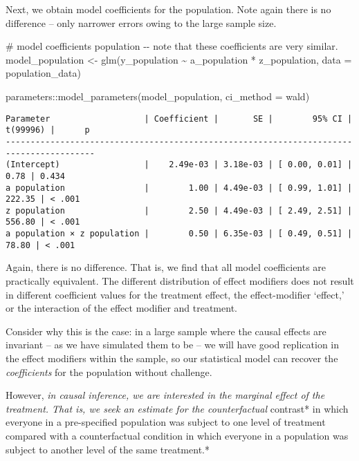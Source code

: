 \documentclass[
  single column]{article}
\newenvironment{Shaded}{\begin{snugshade}}{\end{snugshade}}
\newcommand{\AttributeTok}[1]{\textcolor[rgb]{0.40,0.45,0.13}{#1}}
\newcommand{\CommentTok}[1]{\textcolor[rgb]{0.37,0.37,0.37}{#1}}
\newcommand{\FunctionTok}[1]{\textcolor[rgb]{0.28,0.35,0.67}{#1}}
\newcommand{\NormalTok}[1]{\textcolor[rgb]{0.00,0.23,0.31}{#1}}
\newcommand{\OtherTok}[1]{\textcolor[rgb]{0.00,0.23,0.31}{#1}}
\newcommand{\SpecialCharTok}[1]{\textcolor[rgb]{0.37,0.37,0.37}{#1}}
\newcommand{\StringTok}[1]{\textcolor[rgb]{0.13,0.47,0.30}{#1}}
\begin{document}
Next, we obtain model coefficients for the population. Note again there
is no difference -- only narrower errors owing to the large sample size.

\begin{Shaded}
\begin{Highlighting}[]
\CommentTok{\# model coefficients population {-}{-} note that these coefficients are very similar. }
\NormalTok{model\_population }\OtherTok{\textless{}{-}} \FunctionTok{glm}\NormalTok{(y\_population }\SpecialCharTok{\textasciitilde{}}\NormalTok{ a\_population }\SpecialCharTok{*}\NormalTok{ z\_population, }
  \AttributeTok{data =}\NormalTok{ population\_data)}

\NormalTok{parameters}\SpecialCharTok{::}\FunctionTok{model\_parameters}\NormalTok{(model\_population, }\AttributeTok{ci\_method =} \StringTok{\textquotesingle{}wald\textquotesingle{}}\NormalTok{)}
\end{Highlighting}
\end{Shaded}

\begin{verbatim}
Parameter                   | Coefficient |       SE |        95% CI | t(99996) |      p
----------------------------------------------------------------------------------------
(Intercept)                 |    2.49e-03 | 3.18e-03 | [ 0.00, 0.01] |     0.78 | 0.434 
a population                |        1.00 | 4.49e-03 | [ 0.99, 1.01] |   222.35 | < .001
z population                |        2.50 | 4.49e-03 | [ 2.49, 2.51] |   556.80 | < .001
a population × z population |        0.50 | 6.35e-03 | [ 0.49, 0.51] |    78.80 | < .001
\end{verbatim}

Again, there is no difference. That is, we find that all model
coefficients are practically equivalent. The different distribution of
effect modifiers does not result in different coefficient values for the
treatment effect, the effect-modifier `effect,' or the interaction of
the effect modifier and treatment.

Consider why this is the case: in a large sample where the causal
effects are invariant -- as we have simulated them to be -- we will have
good replication in the effect modifiers within the sample, so our
statistical model can recover the \emph{coefficients} for the population
without challenge.

However, \emph{in causal inference, we are interested in the marginal
effect of the treatment. That is, we seek an estimate for the
counterfactual }contrast* in which everyone in a pre-specified
population was subject to one level of treatment compared with a
counterfactual condition in which everyone in a population was subject
to another level of the same treatment.*
\end{document}
